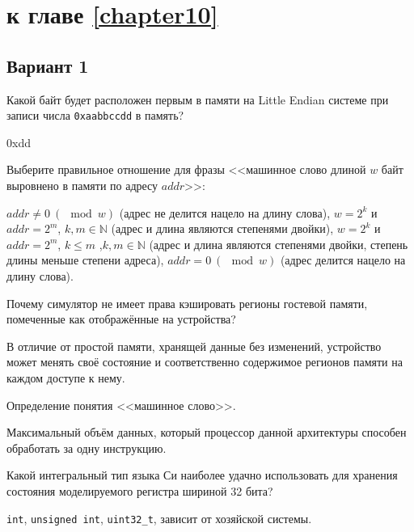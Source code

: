 \section{\Questions к главе \ref{chapter10}} %

\subsection*{Вариант 1}

\begin{questions}

\question[3] Какой байт будет расположен первым в памяти на Little Endian системе при записи числа \texttt{0xaabbccdd} в память?
\begin{solution}[1cm]
0xdd
\end{solution}

\question[3] Выберите правильное отношение для фразы <<машинное слово длиной $w$ байт выровнено в памяти по адресу $addr$>>:
\begin{choices}
    \choice $addr \neq 0\ (\mod w)$ (адрес не делится нацело на длину слова),
    \choice $w = 2^k$ и $addr = 2^m$, $k,m \in \mathbb{N}$ (адрес и длина являются степенями двойки),
    \choice $w = 2^k$ и $addr = 2^m$, $k \leq m $ ,$k,m \in \mathbb{N}$ (адрес и длина являются степенями двойки, степень длины меньше степени адреса),
    \correctchoice $addr = 0\ (\mod w)$ (адрес делится нацело на длину слова).
\end{choices}

\question[3] Почему симулятор не имеет права кэшировать регионы гостевой памяти, помеченные как отображённые на устройства?
\begin{solution}[2cm]
В отличие от простой памяти, хранящей данные без изменений, устройство может менять своё состояние и соответственно содержимое регионов памяти на каждом доступе к нему.
\end{solution}

\question[3] Определение понятия <<машинное слово>>.
\begin{solution}[1cm]
Максимальный объём данных, который процессор данной архитектуры способен обработать за одну инструкцию. 
\end{solution}

\question[3] Какой интегральный тип языка Си наиболее удачно использовать для хранения состояния моделируемого регистра шириной 32 бита?
\begin{choices}
    \choice \texttt{int},
    \choice \texttt{unsigned int},
    \correctchoice \texttt{uint32_t},
    \choice зависит от хозяйской системы.
\end{choices}

\end{questions}

